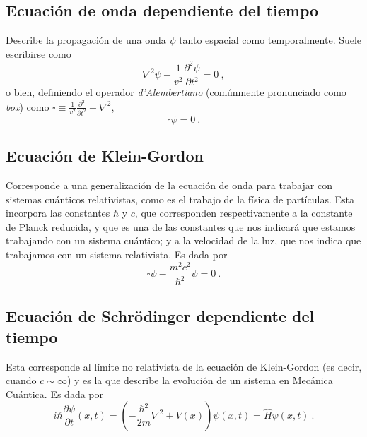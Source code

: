 \subsection*{Ecuación de onda dependiente del tiempo}

Describe la propagación de una onda $\psi$ tanto espacial como temporalmente. Suele escribirse como
\begin{equation}
    \nabla^2 \psi - \frac{1}{v^2}\frac{\partial^2 \psi}{\partial t^2} = 0 \ ,
\end{equation}
o bien, definiendo el operador \emph{d'Alembertiano} (comúnmente pronunciado como \emph{box}) como $\square \equiv \frac{1}{v^2} \frac{\partial^2}{\partial t^2} - \nabla^2$,
\begin{equation}
    \square \psi = 0 \ .
\end{equation}

\subsection*{Ecuación de Klein-Gordon}

Corresponde a una generalización de la ecuación de onda para trabajar con sistemas cuánticos relativistas, como es el trabajo de la física de partículas. Esta incorpora las constantes $\hbar$ y $c$, que corresponden respectivamente a la constante de Planck reducida, y que es una de las constantes que nos indicará que estamos trabajando con un sistema cuántico; y a la velocidad de la luz, que nos indica que trabajamos con un sistema relativista. Es dada por
\begin{equation}
    \square \psi - \frac{m^2c^2}{\hbar^2}\psi = 0 \ .
\end{equation}


\subsection*{Ecuación de Schrödinger dependiente del tiempo}
Esta corresponde al límite no relativista de la ecuación de Klein-Gordon (es decir, cuando $c \sim \infty$) y es la que describe la evolución de un sistema en Mecánica Cuántica. Es dada por
\begin{equation}
    i \hbar \frac{\partial \psi}{\partial t}(x,t) = \left( -\frac{\hbar^2}{2m} \nabla^2 + V(x) \right) \psi(x,t) = \hat{H}\psi(x,t) \ .
\end{equation}


